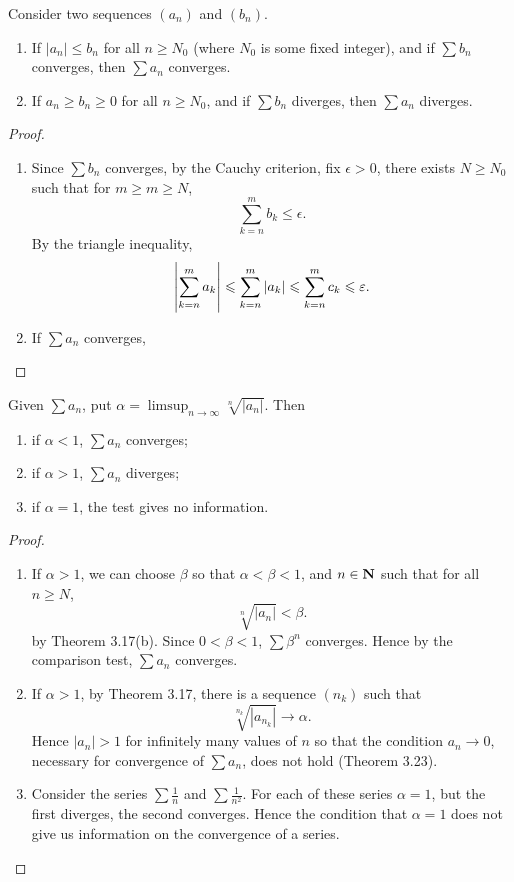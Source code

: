 \begin{lemma}\label{lemma:comparison-test}
Consider two sequences $(a_n)$ and $(b_n)$.
\begin{enumerate}[label=(\roman*)]
\item If $|a_n|\le b_n$ for all $n\ge N_0$ (where $N_0$ is some fixed integer), and if $\sum b_n$ converges, then $\sum a_n$ converges.
\item If $a_n\ge b_n\ge0$ for all $n\ge N_0$, and if $\sum b_n$ diverges, then $\sum a_n$ diverges.
\end{enumerate}
\end{lemma}

\begin{proof} \
\begin{enumerate}[label=(\roman*)]
\item Since $\sum b_n$ converges, by the Cauchy criterion, fix $\epsilon>0$, there exists $N\ge N_0$ such that for $m\ge m\ge N$,
\[\sum_{k=n}^{m}b_k\le\epsilon.\]
By the triangle inequality,
\[\left|\sum_{k=n}^{m}a_k\right|\leqslant\sum_{k=n}^{m}|a_k|\leqslant\sum_{k=n}^{m}c_k\leqslant\varepsilon.\]
\item If $\sum a_n$ converges, 
\end{enumerate}
\end{proof}

\begin{lemma}\label{lemma:root-test}
Given $\sum a_n$, put $\displaystyle\alpha=\limsup_{n\to\infty}\sqrt[n]{|a_n|}$. Then
\begin{enumerate}[label=(\roman*)]
\item if $\alpha<1$, $\sum a_n$ converges;
\item if $\alpha>1$, $\sum a_n$ diverges;
\item if $\alpha=1$, the test gives no information.
\end{enumerate}
\end{lemma}

\begin{proof} \
\begin{enumerate}[label=(\roman*)]
\item If $\alpha>1$, we can choose $\beta$ so that $\alpha<\beta<1$, and $n\in\mathbf N$ such that for all $n\ge N$,
\[\sqrt[n]{|a_n|}<\beta.\]
by Theorem 3.17(b). Since $0<\beta<1$, $\sum\beta^n$ converges. Hence by the comparison test, $\sum a_n$ converges.

\item If $\alpha>1$, by Theorem 3.17, there is a sequence $(n_k)$ such that
\[\sqrt[n_k]{|a_{n_k}|}\to\alpha.\]
Hence $|a_n|>1$ for infinitely many values of $n$ so that the condition $a_n\to0$, necessary for convergence of $\sum a_n$, does not hold (Theorem 3.23).

\item Consider the series $\sum\frac{1}{n}$ and $\sum\frac{1}{n^2}$. For each of these series $\alpha=1$, but the first diverges, the second converges. Hence the condition that $\alpha=1$ does not give us information on the convergence of a series.
\end{enumerate}
\end{proof}

